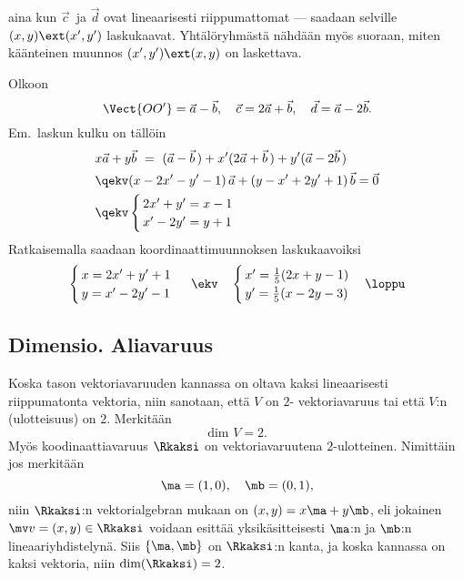 aina kun $\vec c\,$ ja $\vec d$ ovat lineaarisesti riippumattomat --- saadaan selville 
%
 $(x,y) \ext (x',y')$ laskukaavat. Yhtälöryhmästä nähdään myös 
suoraan, miten käänteinen muunnos $(x',y') \ext (x,y)$ on laskettava. 
\begin{Exa} Olkoon
\[
\Vect{OO'}=\vec a - \vec b, \quad \vec c=2\vec a+\vec b, \quad \vec d=\vec a-2\vec b.
\]
Em.\ laskun kulku on tällöin
\begin{align*}
&x\vec a+y\vec b\ =\ (\vec a-\vec b\,)+x'(2\vec a+\vec b\,)+y'(\vec a-2\vec b\,) \\
&\qekv (x-2x'-y'-1)\,\vec a + (y-x'+2y'+1)\,\vec b = \vec 0 \\
&\qekv \begin{cases} \,2x'+y'=x-1 \\ \,x'-2y'=y+1 \end{cases}
\end{align*}
Ratkaisemalla saadaan koordinaattimuunnoksen laskukaavoiksi
\[
\begin{cases} \,x=2x'+y'+1\\ \,y=x'-2y'-1 \end{cases}\ \ekv \quad
\begin{cases} \,x'=\frac{1}{5}(2x+y-1) \\ \,y'=\frac{1}{5}(x-2y-3) \end{cases} \loppu
\]
\end{Exa}

\subsection*{Dimensio. Aliavaruus}
 

Koska tason vektoriavaruuden kannassa on oltava kaksi lineaarisesti riippumatonta vektoria, niin
sanotaan, että $V$ on $2$- vektoriavaruus tai että $V$:n 
(ulotteisuus) on $2$. Merkitään
\[
\text{dim } V=2.
\]
Myös koodinaattiavaruus $\Rkaksi$ on vektoriavaruutena $2$-ulotteinen. Nimittäin jos merkitään
\[
\ma=(1,0), \quad \mb=(0,1),
\]
niin $\Rkaksi$:n vektorialgebran mukaan on $(x,y)=x\ma + y\mb$, eli jokainen
$\mv v = (x,y) \in \Rkaksi$ voidaan esittää yksikäsitteisesti $\ma$:n ja $\mb$:n
lineaariyhdistelynä. Siis $\{\ma,\mb\}$ on $\Rkaksi$:n kanta, ja koska kannassa on kaksi
vektoria, niin $\text{dim}(\Rkaksi)=2$.

